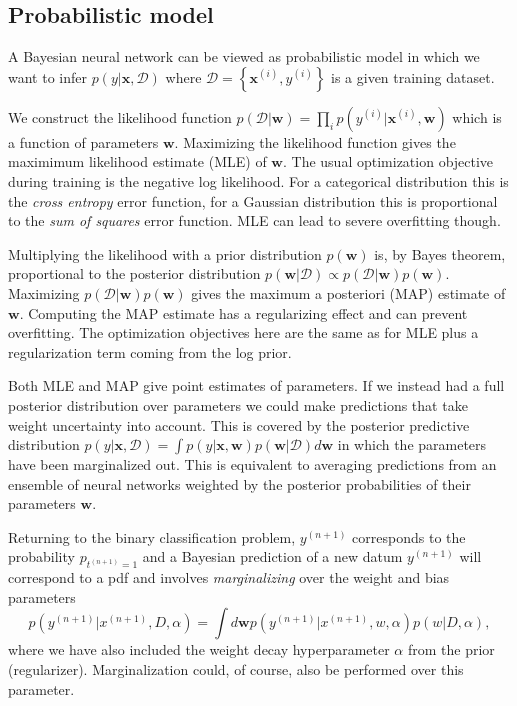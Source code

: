 \documentclass[%
oneside,                 %
final,                   %
10pt]{article}
\begin{document}
\subsection{Probabilistic model}

A Bayesian neural network can be viewed as probabilistic model in which we want to infer $p(y \lvert \boldsymbol{x},\mathcal{D})$ where $\mathcal{D} = \left\{\boldsymbol{x}^{(i)}, y^{(i)}\right\}$ is a given training dataset. 

We construct the likelihood function $p(\mathcal{D} \lvert \boldsymbol{w}) = \prod_i p(y^{(i)} \lvert \boldsymbol{x}^{(i)}, \boldsymbol{w})$ which is a function of parameters $\boldsymbol{w}$. Maximizing the likelihood function gives the maximimum likelihood estimate (MLE) of $\boldsymbol{w}$. The usual optimization objective during training is the negative log likelihood. For a categorical distribution this is the \emph{cross entropy} error function, for a Gaussian distribution this is proportional to the \emph{sum of squares} error function. MLE can lead to severe overfitting though.

Multiplying the likelihood with a prior distribution $p(\boldsymbol{w})$ is, by Bayes theorem, proportional to the posterior distribution $p(\boldsymbol{w} \lvert \mathcal{D}) \propto p(\mathcal{D} \lvert \boldsymbol{w}) p(\boldsymbol{w})$. Maximizing $p(\mathcal{D} \lvert \boldsymbol{w}) p(\boldsymbol{w})$ gives the maximum a posteriori (MAP) estimate of $\boldsymbol{w}$. Computing the MAP estimate has a regularizing effect and can prevent overfitting. The optimization objectives here are the same as for MLE plus a regularization term coming from the log prior.

Both MLE and MAP give point estimates of parameters. If we instead had a full posterior distribution over parameters we could make predictions that take weight uncertainty into account. This is covered by the posterior predictive distribution $p(y \lvert \boldsymbol{x},\mathcal{D}) = \int p(y \lvert \boldsymbol{x}, \boldsymbol{w}) p(\boldsymbol{w} \lvert \mathcal{D}) d\boldsymbol{w}$ in which the parameters have been marginalized out. This is equivalent to averaging predictions from an ensemble of neural networks weighted by the posterior probabilities of their parameters $\boldsymbol{w}$.

Returning to the binary classification problem, $y^{(n+1)}$ corresponds to the probability $p_{t^{(n+1)}=1}$ and a Bayesian prediction of a new datum $y^{(n+1)}$ will correspond to a pdf and involves \emph{marginalizing} over the weight and bias parameters
\[ p(y^{(n+1)} | x^{(n+1)}, D, \alpha) = \int d \boldsymbol{w} p( y^{(n+1)} | x^{(n+1)}, w, \alpha) p(w|D,\alpha), \]
where we have also included the weight decay hyperparameter $\alpha$ from the prior (regularizer). Marginalization could, of course, also be performed over this parameter.
\end{document}
